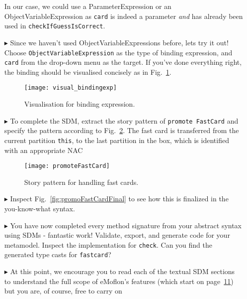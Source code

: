 \begin{itemize}
In our case, we could use a ParameterExpression or an ObjectVariableExpression as \texttt{card} is indeed a parameter \emph{and} has already been used in
\texttt{checkIfGuessIsCorrect}. 

\item[$\blacktriangleright$] Since we haven't used ObjectVariableExpressions before, lets try it out! Choose \texttt{ObjectVariableExpression} as the type of
binding expression, and \texttt{card} from the drop-down menu as the target. If you've done everything right, the binding should be visualised concisely as in
Fig.~\ref{fig:sdm_fastcard_4}.
 
\begin{figure}[htbp]
\begin{center}
  \texttt{[image: visual\_bindingexp]}
  \caption{Visualisation for binding expression.}  
  \label{fig:sdm_fastcard_4}
\end{center}
\end{figure}

\item[$\blacktriangleright$] To complete the SDM, extract the story pattern of \texttt{promote FastCard} and specify the pattern according to
Fig.~\ref{fig:sdm_fastcard_5}.
The fast card is transferred from the current partition \texttt{this}, to the last partition in the box, which is identified with an appropriate \mbox{NAC}

\begin{figure}[htbp]
\begin{center}
  \texttt{[image: promoteFastCard]}
  \caption{Story pattern for handling fast cards.}  
  \label{fig:sdm_fastcard_5}
\end{center}
\end{figure}

\item[$\blacktriangleright$] Inspect Fig.~\ref{fig:promoFastCardFinal} to see how this is finalized in the you-know-what syntax.

\item[$\blacktriangleright$] You have now completed every method signature from your abstract syntax using SDMs - fantastic work! Validate, export, and generate
code for your metamodel. Inspect the implementation for \texttt{check}.  Can you find the generated type casts for \texttt{fastcard}?

\item[$\blacktriangleright$] At this point, we encourage you to read each of the textual SDM sections to understand the full scope of eMoflon's features
(which start on page~\hyperlink{page.11}{11}) but you are, of course, free to carry on


\end{itemize}
